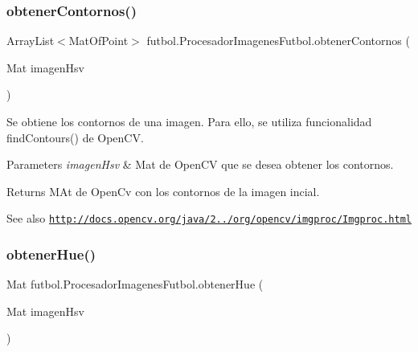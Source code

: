 \subsubsection{\texorpdfstring{obtener\+Contornos()}{obtenerContornos()}}
{\footnotesize\ttfamily Array\+List$<$Mat\+Of\+Point$>$ futbol.\+Procesador\+Imagenes\+Futbol.\+obtener\+Contornos (\begin{DoxyParamCaption}\item[{Mat}]{imagen\+Hsv }\end{DoxyParamCaption})\hspace{0.3cm}{\ttfamily [private]}}

Se obtiene los contornos de una imagen. Para ello, se utiliza funcionalidad find\+Contours() de Open\+CV. 
\begin{DoxyParams}{Parameters}
{\em imagen\+Hsv} & Mat de Open\+CV que se desea obtener los contornos. \\
\hline
\end{DoxyParams}
\begin{DoxyReturn}{Returns}
M\+At de Open\+Cv con los contornos de la imagen incial. 
\end{DoxyReturn}
\begin{DoxySeeAlso}{See also}
\href{http://docs.opencv.org/java/2.4.2/org/opencv/imgproc/Imgproc.html}{\tt http\+://docs.\+opencv.\+org/java/2../org/opencv/imgproc/\+Imgproc.\+html} 
\end{DoxySeeAlso}
\hypertarget{classfutbol_1_1_procesador_imagenes_futbol_a5e1fd4052a65df8d32acedd6b9488567}{}\label{classfutbol_1_1_procesador_imagenes_futbol_a5e1fd4052a65df8d32acedd6b9488567} 
\subsubsection{\texorpdfstring{obtener\+Hue()}{obtenerHue()}}
{\footnotesize\ttfamily Mat futbol.\+Procesador\+Imagenes\+Futbol.\+obtener\+Hue (\begin{DoxyParamCaption}\item[{Mat}]{imagen\+Hsv }\end{DoxyParamCaption})\hspace{0.3cm}{\ttfamily [private]}}

